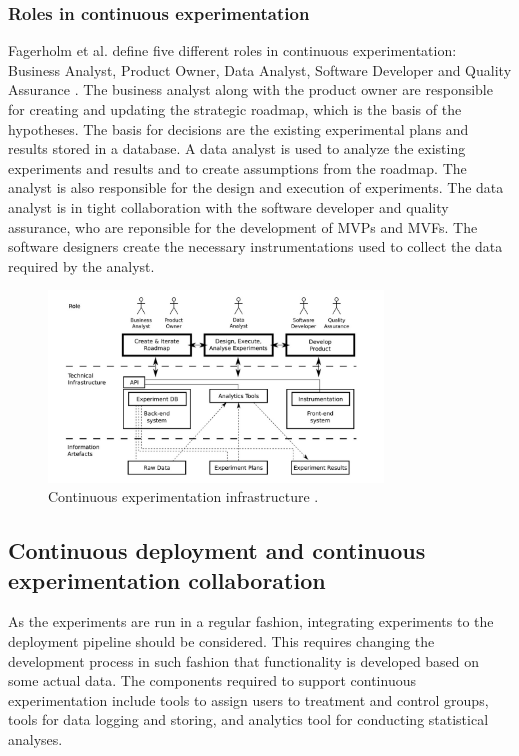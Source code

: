 \documentclass[english]{tktltiki2}
\theoremstyle{definition}
\theoremstyle{remark}
\begin{document}
\subsubsection{Roles in continuous experimentation}
Fagerholm et al. define five different roles in continuous experimentation: Business Analyst, Product Owner, Data Analyst, Software Developer and Quality Assurance \cite{fagerholm2014building}. The business analyst along with the product owner are responsible for creating and updating the strategic roadmap, which is the basis of the hypotheses. The basis for decisions are the existing experimental plans and results stored in a database. A data analyst is used to analyze the existing experiments and results and to create assumptions from the roadmap. The analyst is also responsible for the design and execution of experiments. The data analyst is in tight collaboration with the software developer and quality assurance, who are reponsible for the development of MVPs and MVFs. The software designers create the necessary instrumentations used to collect the data required by the analyst.


\begin{figure}[h]
	\centering
	\includegraphics[width=3.5in]{infra.jpg}
	\caption{Continuous experimentation infrastructure \cite{fagerholm2014building}.}
	\label{fig4}
\end{figure}

\subsection{Continuous deployment and continuous experimentation collaboration}
As the experiments are run in a regular fashion, integrating experiments to the deployment pipeline should be considered. This requires changing the development process in such fashion that functionality is developed based on some actual data. The components required to support continuous experimentation include tools to assign users to treatment and control groups, tools for data logging and storing, and analytics tool for conducting statistical analyses.
\end{document}
